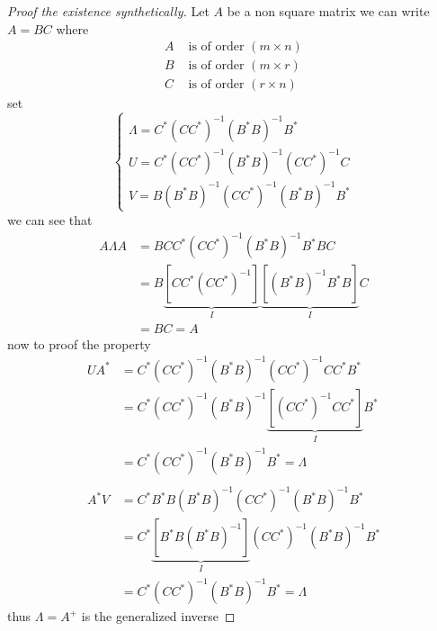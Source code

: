 \documentclass[]{article}
\begin{document}
\begin{proof}[Proof the existence synthetically]
Let $A$ be a non square matrix we can write $A = BC$ where
        \begin{align*}
                A &\text{ is of order } (m\times n)
                \\
                B &\text{ is of order } (m\times r)
                \\
                C &\text{ is of order } (r\times n)
        \end{align*}
set
        \begin{equation*}
                \begin{cases}
                        \displaystyle \Lambda = C^{*}(CC^{*})^{-1}(B^{*}B)^{-1}B^{*}
                        \\
                        \displaystyle U = C^{*}(CC^{*})^{-1}(B^{*}B)^{-1}(CC^{*})^{-1}C
                        \\
                        \displaystyle V = B(B^{*}B)^{-1}(CC^{*})^{-1}(B^{*}B)^{-1}B^{*}
                    \end{cases}
        \end{equation*}
we can see that 
        \begin{align*}
                A\Lambda A &= BCC^{*}(CC^{*})^{-1}(B^{*}B)^{-1}B^{*}BC
                \\
                &= B\underbrace{\left[CC^{*}(CC^{*})^{-1}\right]}_{I}\underbrace{\left[(B^{*}B)^{-1}B^{*}B\right]}_{I}C
                \\
                &= BC = A
        \end{align*}
now to proof the property 
\begin{align*}
        UA^* &=  C^{*}(CC^{*})^{-1}(B^{*}B)^{-1}(CC^{*})^{-1}C C^* B^*
        \\
        &=  C^{*}(CC^{*})^{-1}(B^{*}B)^{-1}\underbrace{\left[(CC^{*})^{-1}C C^*\right]}_{I} B^*
        \\
        &= C^{*}(CC^{*})^{-1}(B^{*}B)^{-1}B^* = \Lambda
        \\
        \\
        A^*V &=  C^* B^*B(B^{*}B)^{-1}(CC^{*})^{-1}(B^{*}B)^{-1}B^{*}
        \\
        &=  C^{*}\underbrace{\left[B^*B(B^{*}B)^{-1}\right]}_{I}(CC^{*})^{-1}(B^{*}B)^{-1}B^{*}
        \\
        &= C^{*}(CC^{*})^{-1}(B^{*}B)^{-1}B^* = \Lambda
\end{align*}
thus $\Lambda = A^{+} $ is the generalized inverse
\end{proof}
\end{document}
